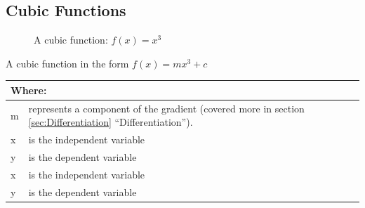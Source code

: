 \subsection{Cubic Functions}
\begin{figure}[!hbt]
\label{fig:FuncGraphCubic}
\caption{A cubic function: $f(x) = {x}^{3}$}
\end{figure}
A cubic function in the form $ f(x) = mx^3 + c$
\begin{table}[!hbt]
\label{tab:PartsOfACubicFunction}
\begin{tabularx}{\linewidth}{| l X |}
  \hline
  \multicolumn{2}{|l|}{Where:} \\
  \hline \hline
  m & represents a component of the gradient (covered more in section
  \ref{sec:Differentiation} ``Differentiation''). \\ x & is the independent
  variable\\ y & is the dependent variable\\
  x & is the independent variable\\
  y & is the dependent variable\\
\hline
\end{tabularx}
\end{table}
%
\clearpage
